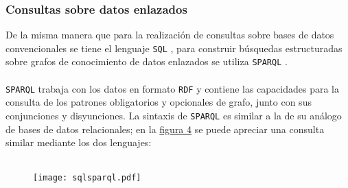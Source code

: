         \subsubsection{Consultas sobre datos enlazados} \label{subsubsec:SPARQL}
            De la misma manera que para la realización de consultas sobre bases de datos convencionales se tiene el lenguaje \texttt{SQL} \cite{ISOSQL}, para construir búsquedas estructuradas sobre grafos de conocimiento de datos enlazados se utiliza \texttt{SPARQL} \cite{SPARQL}.
            \\ \\
            \texttt{SPARQL} trabaja con los datos en formato \texttt{RDF} y contiene las capacidades para la consulta de los patrones obligatorios y opcionales de grafo, junto con sus conjunciones y disyunciones. La sintaxis de \texttt{SPARQL} es similar a la de su análogo de bases de datos relacionales; en la \hyperref[fig:sqlsparql]{figura 4} se puede apreciar una consulta similar mediante los dos lenguajes:
            \\ \\
        
            \begin{figure}[h]
                \centering
                \texttt{[image: sqlsparql.pdf]}
                \label{fig:sqlsparql}
            \end{figure}
            

